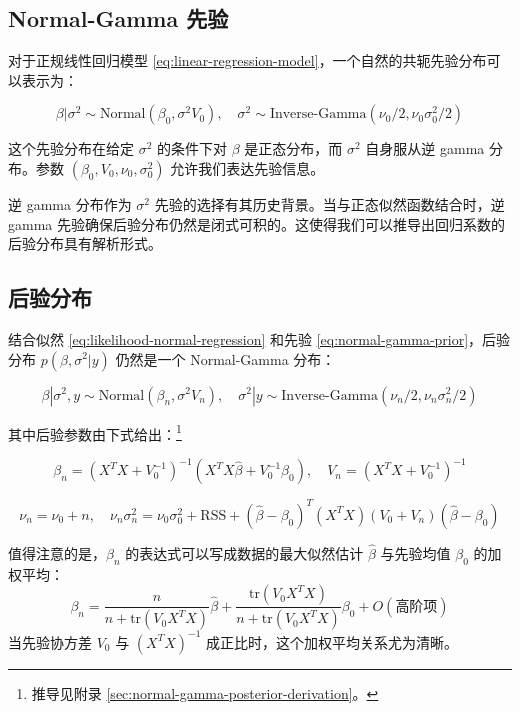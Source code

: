 \subsection{Normal-Gamma 先验}

对于正规线性回归模型 \cref{eq:linear-regression-model}，一个自然的共轭先验分布可以表示为：

\begin{equation}
\beta | \sigma^2 \sim \text{Normal}(\beta_0, \sigma^2 V_0), \quad \sigma^2 \sim \text{Inverse-Gamma}(\nu_0/2, \nu_0\sigma_0^2/2)
\label{eq:normal-gamma-prior}
\end{equation}

这个先验分布在给定 $\sigma^2$ 的条件下对 $\beta$ 是正态分布，而 $\sigma^2$ 自身服从逆 gamma 分布。参数 $(\beta_0, V_0, \nu_0, \sigma_0^2)$ 允许我们表达先验信息。

\begin{Remark}
  逆 gamma 分布作为 $\sigma^2$ 先验的选择有其历史背景。当与正态似然函数结合时，逆 gamma 先验确保后验分布仍然是闭式可积的。这使得我们可以推导出回归系数的后验分布具有解析形式。
\end{Remark}

\subsection{后验分布}

结合似然 \cref{eq:likelihood-normal-regression} 和先验 \cref{eq:normal-gamma-prior}，后验分布 $p(\beta, \sigma^2 | y)$ 仍然是一个 Normal-Gamma 分布：

\begin{equation}
\beta | \sigma^2, y \sim \text{Normal}(\beta_n, \sigma^2 V_n), \quad \sigma^2 | y \sim \text{Inverse-Gamma}(\nu_n/2, \nu_n\sigma_n^2/2)
\label{eq:normal-gamma-posterior}
\end{equation}

其中后验参数由下式给出：\footnote{推导见附录 \cref{sec:normal-gamma-posterior-derivation}。}

\[
\beta_n = (X^TX + V_0^{-1})^{-1}(X^T X\hat{\beta} + V_0^{-1}\beta_0), \quad V_n = (X^TX + V_0^{-1})^{-1}
\]

\[
\nu_n = \nu_0 + n, \quad \nu_n\sigma_n^2 = \nu_0\sigma_0^2 + \text{RSS} + (\hat{\beta} - \beta_0)^T(X^TX)(V_0 + V_n)(\hat{\beta} - \beta_0)
\]

值得注意的是，$\beta_n$ 的表达式可以写成数据的最大似然估计 $\hat{\beta}$ 与先验均值 $\beta_0$ 的加权平均：
\[
\beta_n = \frac{n}{n + \text{tr}(V_0X^TX)}\hat{\beta} + \frac{\text{tr}(V_0X^TX)}{n + \text{tr}(V_0X^TX)}\beta_0 + O(\text{高阶项})
\]
当先验协方差 $V_0$ 与 $(X^TX)^{-1}$ 成正比时，这个加权平均关系尤为清晰。

